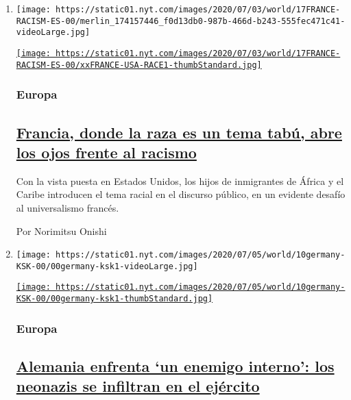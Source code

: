 \begin{enumerate}
\def\labelenumi{\arabic{enumi}.}
\item
  \texttt{[image: https://static01.nyt.com/images/2020/07/03/world/17FRANCE-RACISM-ES-00/merlin\_174157446\_f0d13db0-987b-466d-b243-555fec471c41-videoLarge.jpg]}

  \href{/es/2020/07/17/espanol/mundo/racismo-francia-protestas.html}{\texttt{[image: https://static01.nyt.com/images/2020/07/03/world/17FRANCE-RACISM-ES-00/xxFRANCE-USA-RACE1-thumbStandard.jpg]}}

  \hypertarget{europa}{%
  \subsubsection{Europa}\label{europa}}

  \hypertarget{francia-donde-la-raza-es-un-tema-tabuxfa-abre-los-ojos-frente-al-racismo}{%
  \subsection{\texorpdfstring{\href{/es/2020/07/17/espanol/mundo/racismo-francia-protestas.html}{Francia,
  donde la raza es un tema tabú, abre los ojos frente al
  racismo}}{Francia, donde la raza es un tema tabú, abre los ojos frente al racismo}}\label{francia-donde-la-raza-es-un-tema-tabuxfa-abre-los-ojos-frente-al-racismo}}

  Con la vista puesta en Estados Unidos, los hijos de inmigrantes de
  África y el Caribe introducen el tema racial en el discurso público,
  en un evidente desafío al universalismo francés.

  Por Norimitsu Onishi
\item
  \texttt{[image: https://static01.nyt.com/images/2020/07/05/world/10germany-KSK-00/00germany-ksk1-videoLarge.jpg]}

  \href{/es/2020/07/10/espanol/mundo/alemania-ksk-neonazi.html}{\texttt{[image: https://static01.nyt.com/images/2020/07/05/world/10germany-KSK-00/00germany-ksk1-thumbStandard.jpg]}}

  \hypertarget{europa-1}{%
  \subsubsection{Europa}\label{europa-1}}

  \hypertarget{alemania-enfrenta-un-enemigo-interno-los-neonazis-se-infiltran-en-el-ejuxe9rcito}{%
  \subsection{\texorpdfstring{\href{/es/2020/07/10/espanol/mundo/alemania-ksk-neonazi.html}{Alemania
  enfrenta `un enemigo interno': los neonazis se infiltran en el
  ejército}}{Alemania enfrenta `un enemigo interno': los neonazis se infiltran en el ejército}}\label{alemania-enfrenta-un-enemigo-interno-los-neonazis-se-infiltran-en-el-ejuxe9rcito}}


\end{enumerate}
